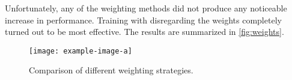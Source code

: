 Unfortunately, any of the weighting methods did not produce any noticeable increase in performance. Training with
disregarding the weights completely turned out to be most effective. The results are summarized in
\autoref{fig:weights}.

\begin{figure}[htb]
    \centering
    \texttt{[image: example-image-a]}
    \caption{Comparison of different weighting strategies.}
    \label{fig:weights}
\end{figure}

